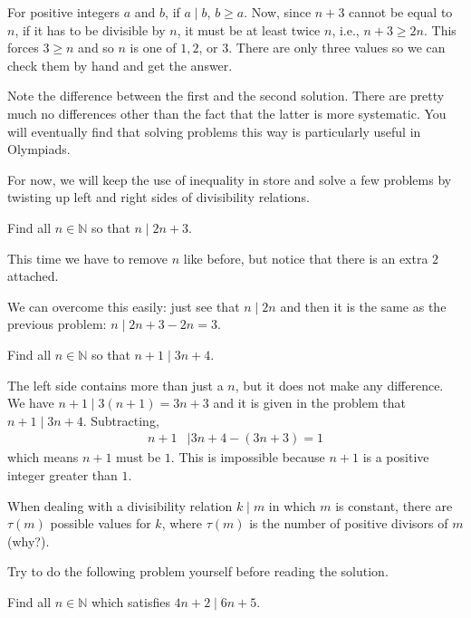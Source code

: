 	\begin{solution}
		For positive integers $a$ and $b$, if $a\mid b$, $b\geq a$. Now, since $n+3$ cannot be equal to $n$, if it has to be divisible by $n$, it must be at least twice $n$, i.e., $n+3\geq2n$. This forces $3\geq n$ and so $n$ is one of $1,2$, or $3$. There are only three values so we can check them by hand and get the answer.
	\end{solution}
Note the difference between the first and the second solution. There are pretty much no differences other than the fact that the latter is more systematic. You will eventually find that solving problems this way is particularly useful in Olympiads.

For now, we will keep the use of inequality in store and solve a few problems by twisting up left and right sides of divisibility relations.
	\begin{problem}
		Find all $n \in \mathbb{N}$ so that $n\mid 2n+3$.
	\end{problem}

	\begin{solution}
		This time we have to remove $n$ like before, but notice that there is an extra $2$ attached.

		We can overcome this easily: just see that $n\mid 2n$ and then it is the same as the previous problem: $n\mid 2n+3-2n=3$.
	\end{solution}

	\begin{problem}
		Find all $n \in \mathbb{N}$ so that $n+1\mid 3n+4$.
	\end{problem}

	\begin{solution}
		The left side contains more than just a $n$, but it does not make any difference. We have $n+1 \mid 3(n+1)=3n+3$ and it is given in the problem that $n+1 \mid 3n+4$. Subtracting,
			\begin{align*}
				n+1
					&\mid 3n+4-(3n+3)=1
			\end{align*}
		which means $n+1$ must be $1$. This is impossible because $n+1$ is a positive integer greater than $1$.
	\end{solution}

	\begin{note}
		When dealing with a divisibility relation $k\mid m$ in which $m$ is constant, there are $\tau(m)$ possible values for $k$, where $\tau(m)$ is the number of positive divisors of $m$ (why?).
	\end{note}
Try to do the following problem yourself before reading the solution.
	\begin{problem}
		Find all $n\in\mathbb{N}$ which satisfies $4n+2\mid 6n+5$.
	\end{problem}

